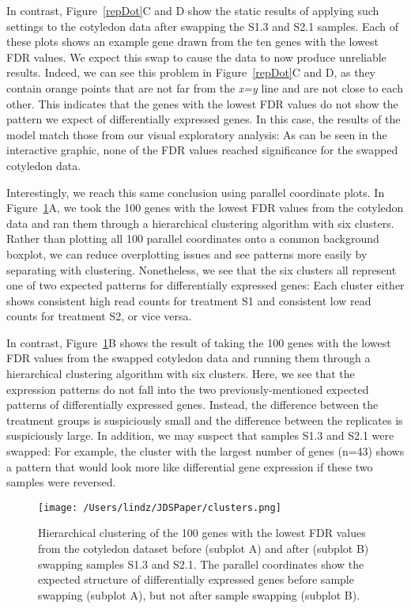 \documentclass[referee]{biom}
\begin{document}
In contrast, Figure~\ref{repDot}C and D show the static results of applying such settings to the cotyledon data after swapping the S1.3 and S2.1 samples. Each of these plots shows an example gene drawn from the ten genes with the lowest FDR values. We expect this swap to cause the data to now produce unreliable results. Indeed, we can see this problem in Figure~\ref{repDot}C and D, as they contain orange points that are not far from the \textit{x=y} line and are not close to each other. This indicates that the genes with the lowest FDR values do not show the pattern we expect of differentially expressed genes. In this case, the results of the model match those from our visual exploratory analysis: As can be seen in the interactive graphic, none of the FDR values reached significance for the swapped cotyledon data.

Interestingly, we reach this same conclusion using parallel coordinate plots. In Figure~\ref{clusters}A, we took the 100 genes with the lowest FDR values from the cotyledon data and ran them through a hierarchical clustering algorithm with six clusters. Rather than plotting all 100 parallel coordinates onto a common background boxplot, we can reduce overplotting issues and see patterns more easily by separating with clustering. Nonetheless, we see that the six clusters all represent one of two expected patterns for differentially expressed genes: Each cluster either shows consistent high read counts for treatment S1 and consistent low read counts for treatment S2, or vice versa.

In contrast, Figure~\ref{clusters}B shows the result of taking the 100 genes with the lowest FDR values from the swapped cotyledon data and running them through a hierarchical clustering algorithm with six clusters. Here, we see that the expression patterns do not fall into the two previously-mentioned expected patterns of differentially expressed genes. Instead, the difference between the treatment groups is suspiciously small and the difference between the replicates is suspiciously large. In addition, we may suspect that samples S1.3 and S2.1 were swapped: For example, the cluster with the largest number of genes (n=43) shows a pattern that would look more like differential gene expression if these two samples were reversed.

\begin{figure}
\begin{center}
\centerline{\texttt{[image: /Users/lindz/JDSPaper/clusters.png]}}
\end{center}
\caption{Hierarchical clustering of the 100 genes with the lowest FDR values from the cotyledon dataset before (subplot A) and after (subplot B) swapping samples S1.3 and S2.1. The parallel coordinates show the expected structure of differentially expressed genes before sample swapping (subplot A), but not after sample swapping (subplot B).
\label{clusters}}
\end{figure}
\end{document}
